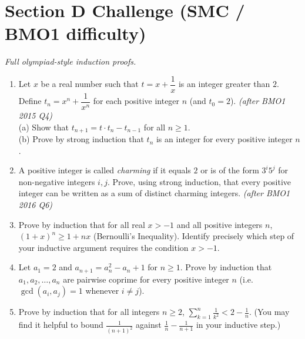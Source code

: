 \documentclass[11pt,a4paper]{article}
\begin{document}
\section*{Section D \quad Challenge \hfill{\normalfont\small(SMC / BMO1 difficulty)}}

\noindent\textit{Full olympiad-style induction proofs.}

\begin{enumerate}

\item Let $x$ be a real number such that $t=x+\dfrac1x$ is an integer greater than $2$. Define $t_n=x^n+\dfrac1{x^n}$ for each positive integer $n$ (and $t_0=2$). \textit{\small(after BMO1 2015 Q4)}\\
(a) Show that $t_{n+1}=t\cdot t_n-t_{n-1}$ for all $n\geq1$.\\
(b) Prove by strong induction that $t_n$ is an integer for every positive integer $n$.

\item A positive integer is called \emph{charming} if it equals $2$ or is of the form $3^i5^j$ for non-negative integers $i,j$. Prove, using strong induction, that every positive integer can be written as a sum of distinct charming integers. \textit{\small(after BMO1 2016 Q6)}

\item Prove by induction that for all real $x>-1$ and all positive integers $n$, $(1+x)^n\geq1+nx$ (Bernoulli's Inequality). Identify precisely which step of your inductive argument requires the condition $x>-1$.

\item Let $a_1=2$ and $a_{n+1}=a_n^2-a_n+1$ for $n\geq1$. Prove by induction that $a_1,a_2,\dots,a_n$ are pairwise coprime for every positive integer $n$ (i.e.\ $\gcd(a_i,a_j)=1$ whenever $i\neq j$).

\item Prove by induction that for all integers $n\geq2$, $\displaystyle\sum_{k=1}^n\frac1{k^2}<2-\frac1n$. (You may find it helpful to bound $\frac1{(n+1)^2}$ against $\frac1n-\frac1{n+1}$ in your inductive step.)

\end{enumerate}

\end{document}
